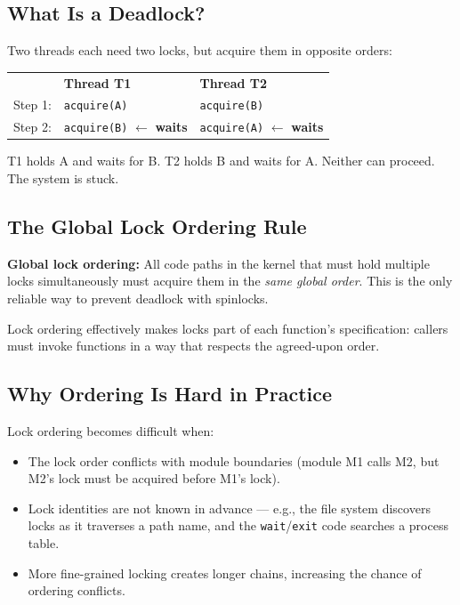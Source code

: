 \documentclass[11pt, a4paper]{article}
\begin{document}
\subsection{What Is a Deadlock?}

\begin{tcolorbox}[deadlock, title={Deadlock: The Classic Scenario}]
Two threads each need two locks, but acquire them in opposite orders:

\medskip
\begin{tabular}{lll}
& \textbf{Thread T1} & \textbf{Thread T2} \\
Step 1: & \lstinline|acquire(A)| & \lstinline|acquire(B)| \\
Step 2: & \lstinline|acquire(B)| $\leftarrow$ \textbf{waits} & \lstinline|acquire(A)| $\leftarrow$ \textbf{waits} \\
\end{tabular}

\medskip
T1 holds A and waits for B. T2 holds B and waits for A. Neither can proceed. The system is stuck.
\end{tcolorbox}

\subsection{The Global Lock Ordering Rule}

\begin{tcolorbox}[foundational]
\textbf{Global lock ordering:} All code paths in the kernel that must hold multiple locks simultaneously must acquire them in the \emph{same global order}. This is the only reliable way to prevent deadlock with spinlocks.

Lock ordering effectively makes locks part of each function's specification: callers must invoke functions in a way that respects the agreed-upon order.
\end{tcolorbox}

\subsection{Why Ordering Is Hard in Practice}

Lock ordering becomes difficult when:
\begin{itemize}[leftmargin=1.5em]
  \item The lock order conflicts with module boundaries (module M1 calls M2, but M2's lock must be acquired before M1's lock).
  \item Lock identities are not known in advance --- e.g., the file system discovers locks as it traverses a path name, and the \lstinline|wait|/\lstinline|exit| code searches a process table.
  \item More fine-grained locking creates longer chains, increasing the chance of ordering conflicts.
\end{itemize}
\end{document}

